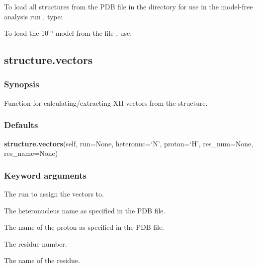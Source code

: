  To load all structures from the PDB file  in the directory  for use in the model-free analysis run , type: 
  



 To load the 10$^\mathrm{th}$ model from the file , use: 
  



  

 \newpage 

 \subsection{structure.vectors} 

  
 \subsubsection{Synopsis} 

 Function for calculating/extracting XH vectors from the structure. 
  

  
 \subsubsection{Defaults} 

 \textsf{\textbf{structure.vectors}(self, run=None, heteronuc=`N', proton=`H', res\_num=None, res\_name=None)} 

  
 \subsubsection{Keyword arguments} 

   The run to assign the vectors to.   

   The heteronucleus name as specified in the PDB file.   

   The name of the proton as specified in the PDB file.   

   The residue number.   

   The name of the residue.  

